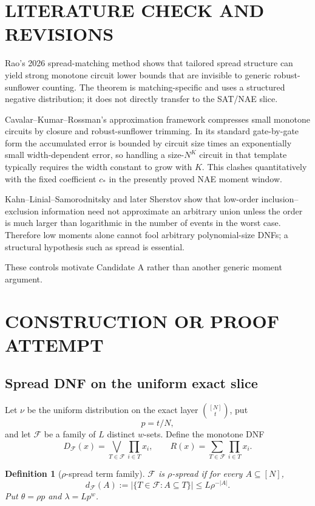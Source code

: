 \documentclass[11pt]{article}
\newtheorem{definition}[theorem]{Definition}
\begin{document}
\section{LITERATURE CHECK AND REVISIONS}
Rao's 2026 spread-matching method shows that tailored spread structure can yield strong monotone circuit lower bounds that are invisible to generic robust-sunflower counting. The theorem is matching-specific and uses a structured negative distribution; it does not directly transfer to the SAT/NAE slice.

Cavalar--Kumar--Rossman's approximation framework compresses small monotone circuits by closure and robust-sunflower trimming. In its standard gate-by-gate form the accumulated error is bounded by circuit size times an exponentially small width-dependent error, so handling a size-$N^K$ circuit in that template typically requires the width constant to grow with $K$. This clashes quantitatively with the fixed coefficient $c_*$ in the presently proved NAE moment window.

Kahn--Linial--Samorodnitsky and later Sherstov show that low-order inclusion--exclusion information need not approximate an arbitrary union unless the order is much larger than logarithmic in the number of events in the worst case. Therefore low moments alone cannot fool arbitrary polynomial-size DNFs; a structural hypothesis such as spread is essential.

These controls motivate Candidate A rather than another generic moment argument.

\section{CONSTRUCTION OR PROOF ATTEMPT}
\subsection{Spread DNF on the uniform exact slice}
Let $\nu$ be the uniform distribution on the exact layer $\binom{[N]}t$, put
\[p=t/N,\]
and let $\mathcal F$ be a family of $L$ distinct $w$-sets. Define the monotone DNF
\[D_{\mathcal F}(x)=\bigvee_{T\in\mathcal F}\prod_{i\in T}x_i,\qquad R(x)=\sum_{T\in\mathcal F}\prod_{i\in T}x_i.\]

\begin{definition}[$\rho$-spread term family]
$\mathcal F$ is $\rho$-spread if for every $A\subseteq[N]$,
\[d_{\mathcal F}(A):=|\{T\in\mathcal F:A\subseteq T\}|\le L\rho^{-|A|}.\]
Put $\theta=\rho p$ and $\lambda=Lp^w$.
\end{definition}
\end{document}
